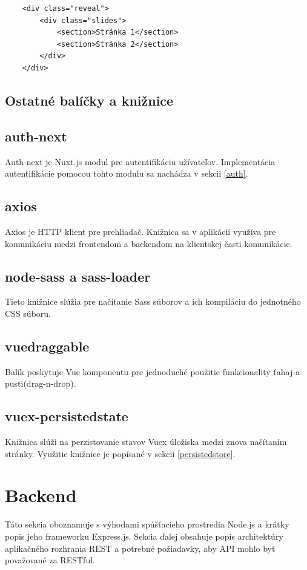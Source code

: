     \begin{verbatim}
    <div class="reveal">
        <div class="slides">
            <section>Stránka 1</section>
            <section>Stránka 2</section>
        </div>
    </div>
    \end{verbatim}


\subsection{Ostatné balíčky a knižnice}
\subsection*{auth-next}
Auth-next je Nuxt.js modul pre autentifikáciu užívateľov. Implementácia autentifikácie pomocou tohto modulu sa nachádza v sekcii \ref{auth}.

\subsection*{axios}
Axios je HTTP klient pre prehliadač. Knižnica sa v aplikácii využíva pre komunikáciu medzi frontendom a backendom na klientskej časti komunikácie. 

\subsection*{node-sass a sass-loader}
Tieto knižnice slúžia pre načítanie Sass súborov a ich kompiláciu do jednotného CSS súboru.

\subsection*{vuedraggable}
Balík poskytuje Vue komponentu pre jednoduché použitie funkcionality ťahaj-a-pusti(drag-n-drop).

\subsection*{vuex-persistedstate}
Knižnica slúži na perzistovanie stavov Vuex úložiska medzi znova načítaním stránky. Využitie knižnice je popísané v sekcii \ref{persistedstore}.

\section{Backend}
Táto sekcia oboznamuje s výhodami spúšťacieho prostredia Node.js a krátky popis jeho frameworku Express.js. Sekcia ďalej obsahuje popis architektúry aplikačného rozhrania REST a potrebné požiadavky, aby API mohlo byť považované za RESTful. 

